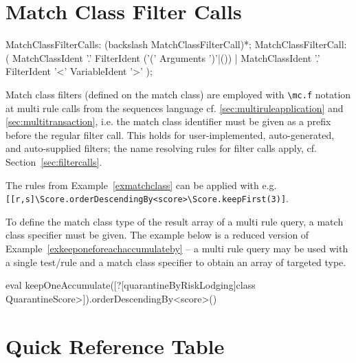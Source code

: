 \section{Match Class Filter Calls}

\begin{rail}
	MatchClassFilterCalls: (backslash MatchClassFilterCall)*;
  MatchClassFilterCall: ( MatchClassIdent '.' FilterIdent ('(' Arguments ')'|()) | MatchClassIdent '.' FilterIdent '<' VariableIdent '>' );
\end{rail}

Match class filters (defined on the match class) are employed with \verb#\mc.f# notation at multi rule calls from the sequences language cf. \ref{sec:multiruleapplication} and \ref{sec:multitransaction}, i.e. the match class identifier must be given as a prefix before the regular filter call.
This holds for user-implemented, auto-generated, and auto-supplied filters; the name resolving rules for filter calls apply, cf. Section~\ref{sec:filtercalls}.

\begin{example}
The rules from Example~\ref{exmatchclass} can be applied with e.g.\\
\verb#[[r,s]\Score.orderDescendingBy<score>\Score.keepFirst(3)]#.
\end{example}

To define the match class type of the result array of a multi rule query, a match class specifier must be given.
The example below is a reduced version of Example~\ref{exkeeponeforeachaccumulateby} -- a multi rule query may be used with a single test/rule and a match class specifier to obtain an array of targeted type.

\begin{example}
	\begin{grshell}
	eval keepOneAccumulate([?[quarantineByRiskLodging]\<class QuarantineScore>]).orderDescendingBy<score>()
	\end{grshell}
\end{example}

\pagebreak

\section{Quick Reference Table}

